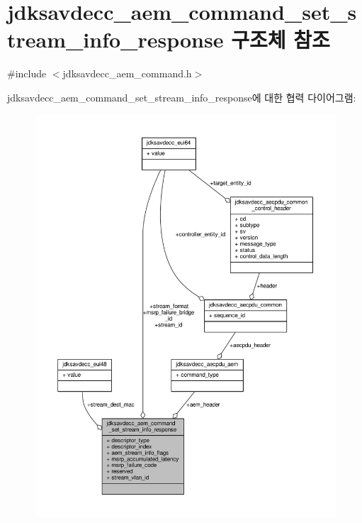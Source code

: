 \hypertarget{structjdksavdecc__aem__command__set__stream__info__response}{}\section{jdksavdecc\+\_\+aem\+\_\+command\+\_\+set\+\_\+stream\+\_\+info\+\_\+response 구조체 참조}
\label{structjdksavdecc__aem__command__set__stream__info__response}


{\ttfamily \#include $<$jdksavdecc\+\_\+aem\+\_\+command.\+h$>$}



jdksavdecc\+\_\+aem\+\_\+command\+\_\+set\+\_\+stream\+\_\+info\+\_\+response에 대한 협력 다이어그램\+:
\nopagebreak
\begin{figure}[H]
\begin{center}
\leavevmode
\includegraphics[width=350pt]{structjdksavdecc__aem__command__set__stream__info__response__coll__graph}
\end{center}
\end{figure}
